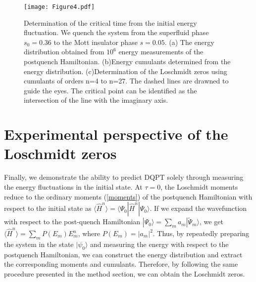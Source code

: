\documentclass[%
reprint,
superscriptaddress,
amsmath,amssymb,
aps,
pra,
floatfix,
]{revtex4-1}
\begin{document}
\begin{figure*}[htbp]
	\texttt{[image: Figure4.pdf]}
	\caption{ Determination of the critical time from the initial energy fluctuation. We quench the system from the superfluid phase $s_0=0.36$ to the Mott insulator phase $s=0.05$. (a) The energy distribution obtained from $10^6$ energy measurements of the postquench Hamiltonian. (b)Energy cumulants determined from the energy distribution. (c)Determination of the Loschmidt zeros using cumulants of orders n=4 to n=27. The dashed lines are drawned to guide the eyes. The critical point can be identified as the intersection of the line with the imaginary axis.
	}
	\label{fig:exp}	
\end{figure*}


\section{Experimental perspective of the Loschmidt zeros} 

Finally, we demonstrate the ability to predict DQPT solely through measuring the energy fluctuations in the initial state. At $\tau=0$, the Loschmidt moments reduce to the ordinary moments (\ref{moments}) of the postquench Hamiltonian with respect to the initial state as $\langle \hat{H}^n\rangle =\langle \Psi_0| \hat{H}^n| \Psi_0\rangle$. If we expand  the wavefunction with respect to the post-quench Hamiltonian $| \Psi_0\rangle=\sum_m a_m |\tilde{\Psi}_m \rangle$, we get $\langle \hat{H}^n\rangle =\sum_m P(E_m) E_m^n $, where $P(E_m)=|a_m|^2$.
Thus, by repeatedly preparing the system in the state $|\psi_0\rangle$ and measuring the energy with respect to the postquench Hamiltonian, we can construct the energy distribution and extract the corresponding moments and cumulants. Therefore, by following the same procedure presented in the method section, we can obtain the Loschmidt zeros.
\end{document}
